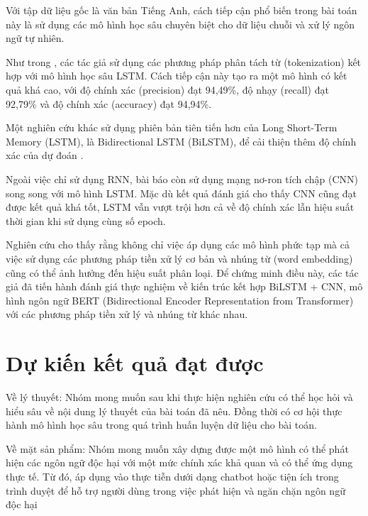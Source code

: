 Với tập dữ liệu gốc là văn bản Tiếng Anh, cách tiếp cận phổ biến trong bài toán này là sử dụng các mô hình học sâu chuyên biệt cho dữ liệu chuỗi và xử lý ngôn ngữ tự nhiên.

Như trong \cite{9339521}, các tác giả sử dụng các phương pháp phân tách từ (tokenization) kết hợp với mô hình học sâu LSTM. Cách tiếp cận này tạo ra một mô hình có kết quả khá cao, với độ chính xác (precision) đạt 94,49\%, độ nhạy (recall) đạt 92,79\% và độ chính xác (accuracy) đạt 94,94\%.

Một nghiên cứu khác sử dụng phiên bản tiên tiến hơn của Long Short-Term Memory (LSTM), là Bidirectional LSTM (BiLSTM), để cải thiện thêm độ chính xác của dự đoán \cite{webpage25}.

Ngoài việc chỉ sử dụng RNN, bài báo \cite{Sharma2018} còn sử dụng mạng nơ-ron tích chập (CNN) song song với mô hình LSTM. Mặc dù kết quả đánh giá cho thấy CNN cũng đạt được kết quả khá tốt, LSTM vẫn vượt trội hơn cả về độ chính xác lẫn hiệu suất thời gian khi sử dụng cùng số epoch.

Nghiên cứu \cite{app10238631} cho thấy rằng không chỉ việc áp dụng các mô hình phức tạp mà cả việc sử dụng các phương pháp tiền xử lý cơ bản và nhúng từ (word embedding) cũng có thể ảnh hưởng đến hiệu suất phân loại. Để chứng minh điều này, các tác giả đã tiến hành đánh giá thực nghiệm về kiến trúc kết hợp BiLSTM + CNN, mô hình ngôn ngữ BERT (Bidirectional Encoder Representation from Transformer) với các phương pháp tiền xử lý và nhúng từ khác nhau.

\section{Dự kiến kết quả đạt được}
Về lý thuyết: Nhóm mong muốn sau khi thực hiện nghiên cứu có thể học hỏi và hiểu sâu về nội dung lý thuyết của bài toán đã nêu. Đồng thời có cơ hội thực hành mô hình học sâu trong quá trình huấn luyện dữ liệu cho bài toán.

Về mặt sản phẩm: Nhóm mong muốn xây dựng được một mô hình có thể phát hiện các ngôn ngữ độc hại với một mức chính xác khả quan và có thể ứng dụng thực tế. Từ đó, áp dụng vào thực tiễn dưới dạng chatbot hoặc tiện ích trong trình duyệt để hỗ trợ người dùng trong việc phát hiện và ngăn chặn ngôn ngữ độc hại
